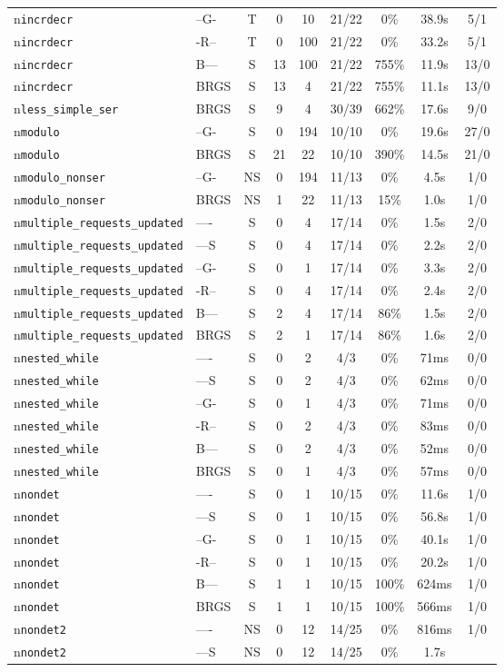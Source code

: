\begin{tabular}{llccccccc}
\\n\texttt{incrdecr} & --G- & T & 0 & 10 & 21/22 & 0\% & 38.9s & 5/1 \\n\texttt{incrdecr} & -R-- & T & 0 & 100 & 21/22 & 0\% & 33.2s & 5/1 \\n\texttt{incrdecr} & B--- & S & 13 & 100 & 21/22 & 755\% & 11.9s & 13/0 \\n\texttt{incrdecr} & BRGS & S & 13 & 4 & 21/22 & 755\% & 11.1s & 13/0 \\n\texttt{less\_simple\_ser} & BRGS & S & 9 & 4 & 30/39 & 662\% & 17.6s & 9/0 \\n\texttt{modulo} & --G- & S & 0 & 194 & 10/10 & 0\% & 19.6s & 27/0 \\n\texttt{modulo} & BRGS & S & 21 & 22 & 10/10 & 390\% & 14.5s & 21/0 \\n\texttt{modulo\_nonser} & --G- & NS & 0 & 194 & 11/13 & 0\% & 4.5s & 1/0 \\n\texttt{modulo\_nonser} & BRGS & NS & 1 & 22 & 11/13 & 15\% & 1.0s & 1/0 \\n\texttt{multiple\_requests\_updated} & ---- & S & 0 & 4 & 17/14 & 0\% & 1.5s & 2/0 \\n\texttt{multiple\_requests\_updated} & ---S & S & 0 & 4 & 17/14 & 0\% & 2.2s & 2/0 \\n\texttt{multiple\_requests\_updated} & --G- & S & 0 & 1 & 17/14 & 0\% & 3.3s & 2/0 \\n\texttt{multiple\_requests\_updated} & -R-- & S & 0 & 4 & 17/14 & 0\% & 2.4s & 2/0 \\n\texttt{multiple\_requests\_updated} & B--- & S & 2 & 4 & 17/14 & 86\% & 1.5s & 2/0 \\n\texttt{multiple\_requests\_updated} & BRGS & S & 2 & 1 & 17/14 & 86\% & 1.6s & 2/0 \\n\texttt{nested\_while} & ---- & S & 0 & 2 & 4/3 & 0\% & 71ms & 0/0 \\n\texttt{nested\_while} & ---S & S & 0 & 2 & 4/3 & 0\% & 62ms & 0/0 \\n\texttt{nested\_while} & --G- & S & 0 & 1 & 4/3 & 0\% & 71ms & 0/0 \\n\texttt{nested\_while} & -R-- & S & 0 & 2 & 4/3 & 0\% & 83ms & 0/0 \\n\texttt{nested\_while} & B--- & S & 0 & 2 & 4/3 & 0\% & 52ms & 0/0 \\n\texttt{nested\_while} & BRGS & S & 0 & 1 & 4/3 & 0\% & 57ms & 0/0 \\n\texttt{nondet} & ---- & S & 0 & 1 & 10/15 & 0\% & 11.6s & 1/0 \\n\texttt{nondet} & ---S & S & 0 & 1 & 10/15 & 0\% & 56.8s & 1/0 \\n\texttt{nondet} & --G- & S & 0 & 1 & 10/15 & 0\% & 40.1s & 1/0 \\n\texttt{nondet} & -R-- & S & 0 & 1 & 10/15 & 0\% & 20.2s & 1/0 \\n\texttt{nondet} & B--- & S & 1 & 1 & 10/15 & 100\% & 624ms & 1/0 \\n\texttt{nondet} & BRGS & S & 1 & 1 & 10/15 & 100\% & 566ms & 1/0 \\n\texttt{nondet2} & ---- & NS & 0 & 12 & 14/25 & 0\% & 816ms & 1/0 \\n\texttt{nondet2} & ---S & NS & 0 & 12 & 14/25 & 0\% & 1.7s 
\end{tabular}
